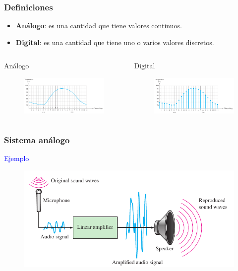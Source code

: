 \documentclass[10.5pt,scale=1.0,t,aspectratio=169,hyperref={pdfpagelabels=false}]{beamer}
\begin{document}
\begin{frame}
	\frametitle{Definiciones}
\begin{itemize}
	\item {\bf Análogo}: es una cantidad que tiene valores continuos. 
	\item {\bf Digital}: es una cantidad que tiene uno o varios valores discretos. 
\end{itemize}
\begin{columns}
	\begin{block}{\small Análogo}
		\justifying
		\vspace{-0.05in}
		\begin{figure}
			\centering
			\includegraphics[width=2.1in]{VariableAnaloga}
		\end{figure}
	\end{block}
	
	\begin{block}{\small Digital}
		\justifying
		\begin{figure}
			\centering
			\includegraphics[width=2.1in]{VariableDiscreta}
		\end{figure}
	\end{block}
\end{columns}
\end{frame}
\begin{frame}
\frametitle{Sistema análogo}
 \textcolor{blue}{\large Ejemplo} \\
\begin{figure}
	\centering
	\includegraphics[width=14cm]{SistemaMicrofono}
\end{figure}	
\end{frame}
\end{document}
